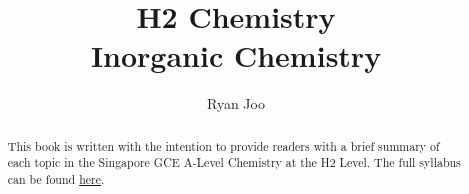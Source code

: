 \documentclass[12pt,a4 paper]{article}
\begin{document}
\title{\textbf{H2 Chemistry\\ Inorganic Chemistry}}
\author{Ryan Joo}

\maketitle

\begin{abstract}
This book is written with the intention to provide readers with a brief summary of each topic in the Singapore GCE A-Level Chemistry at the H2 Level. The full syllabus can be found \href{https://www.seab.gov.sg/docs/default-source/national-examinations/syllabus/alevel/2024syllabus/9729_y24_sy.pdf}{here}.
\end{abstract}
\pagebreak

\tableofcontents
\pagebreak



\end{document}

